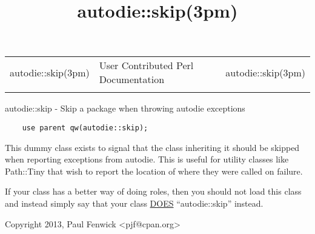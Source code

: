 \documentclass[]{article}
\title{autodie::skip(3pm)}
\author{}
\date{}
\renewcommand{\emph}[1]{\underline{#1}}
\begin{document}
\maketitle

\begin{longtable}[c]{@{}lll@{}}
\toprule\addlinespace
autodie::skip(3pm) & User Contributed Perl Documentation &
autodie::skip(3pm)
\\\addlinespace
\bottomrule
\end{longtable}


autodie::skip - Skip a package when throwing autodie exceptions


\begin{verbatim}
    use parent qw(autodie::skip);
\end{verbatim}


This dummy class exists to signal that the class inheriting it should be
skipped when reporting exceptions from autodie. This is useful for
utility classes like Path::Tiny that wish to report the location of
where they were called on failure.

If your class has a better way of doing roles, then you should not load
this class and instead simply say that your class \emph{DOES}
``autodie::skip'' instead.


Copyright 2013, Paul Fenwick \textless{}pjf@cpan.org\textgreater{}

\end{document}
